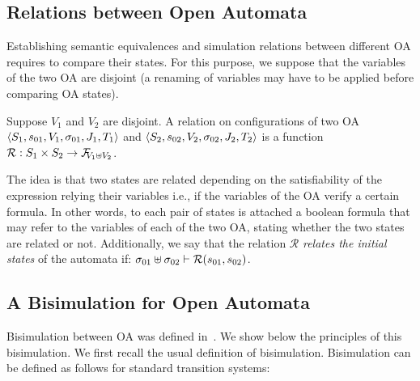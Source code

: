 \documentclass[runningheads]{llncs}
\begin{document}
\subsection{Relations between Open Automata}
Establishing semantic equivalences and simulation relations between different OA requires  to compare their states. For this purpose, we suppose that the variables of the two OA are disjoint (a renaming of variables may have to be applied before comparing OA states).
\begin{definition} Suppose $V_1$ and $V_2$ are disjoint.
A relation on configurations of two OA \(\OAg[1]\) and \(\OAg[2]\) is a function \( \mathcal{R}: S_1 \times S_2 \to \rformulas[V_1 \uplus V_2]\).
\end{definition}
The idea is that two states are related depending on the satisfiability of the expression relying their variables i.e., if the variables of the OA verify a certain formula. 
In other words, to each pair of states is attached a boolean formula that may refer to the  variables of each of the two OA, stating whether the two states are related or not.
Additionally, we say that the relation $ \mathcal{R}$ \emph{relates the initial states} of the automata if: \(\sigma_{01} \uplus \sigma_{02} \vdash  \mathcal{R}\mpar{s_{01}, s_{02}}\).


\subsection{A Bisimulation for Open Automata}

Bisimulation between OA was defined in~\cite{AMHEEMA:2023}.  We show below the principles of this bisimulation. We first recall the usual definition of bisimulation.
Bisimulation can  be defined as follows for standard transition systems: 
\end{document}
